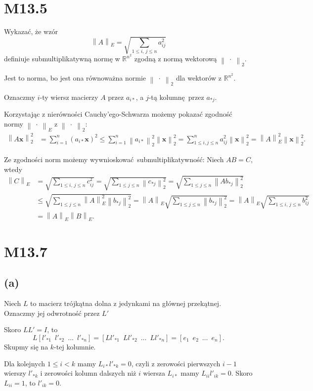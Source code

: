 \documentclass[a4paper, 12pt]{article}
\newcommand{\norm}[1]{\left\lVert #1 \right\rVert}
\newcommand{\+}{\enspace}
\begin{document}
\section*{M13.5}
Wykazać, że wzór
$$\norm{A}_E = \sqrt{∑_{1≤i,\, j≤n} a_{ij}^2}$$
definiuje submultiplikatywną normę w $ℝ^{n^2}$ zgodną z normą wektorową
$\norm{\;·\;}_2$.

Jest to norma, bo jest ona równoważna normie $\norm{\;·\;}_2$ dla wektorów z
$ℝ^{n^2}$.

Oznaczmy $i$-ty wiersz macierzy $A$ przez $a_{i*}$,
a $j$-tą kolumnę przez $a_{*j}$.

Korzystając z nierówności Cauchy'ego-Schwarza możemy pokazać
zgodność normy $\norm{\;·\;}_E$ z $\norm{\;·\;}_2$:
\begin{align*}
\norm{A\mathbf{x}}_2^2
&= ∑_{i=1}^n \left(a_{i*}\mathbf{x}\right)^2
≤ ∑_{i=1}^n \norm{a_{i*}}_2^2 \norm{\mathbf{x}}_2^2
= ∑_{1≤i,j≤n}^n a_{ij}^2 \norm{\mathbf{x}}_2^2
= \norm{A}_E^2 \norm{\mathbf{x}}_2^2.
\end{align*}

Ze zgodności norm możemy wywnioskować submultiplikatywność:
Niech $AB = C$, wtedy
\begin{align*}
\norm{C}_E
&= \sqrt{∑_{1≤i,\, j≤n} c_{ij}^2}
= \sqrt{∑_{1≤j≤n} \norm{c_{*j}}_2^2}
= \sqrt{∑_{1≤j≤n} \norm{A b_{*j}}_2^2} \\
&≤ \sqrt{∑_{1≤j≤n} \norm{A}_E^2 \norm{b_{*j}}_2^2}
= \norm{A}_E \sqrt{∑_{1≤j≤n} \norm{b_{*j}}_2^2}
= \norm{A}_E \sqrt{∑_{1≤i,\, j≤n} b_{ij}^2} \\
&= \norm{A}_E \norm{B}_E.
\end{align*}

\section*{M13.7}
\subsection*{(a)}
Niech $L$ to macierz trójkątna dolna z jedynkami na głównej przekątnej.
Oznaczmy jej odwrotność przez $L'$

Skoro $L L' = I$, to
$$
L [l'_{*1} \+ l'_{*2} \+ … \+ l'_{*n}]
=[L l'_{*1} \+ L l'_{*2} \+ … \+ L l'_{*n}]
=[e_1 \+ e_2 \+ … \+ e_n].
$$
Skupmy się na $k$-tej kolumnie.

Dla kolejnych $1 ≤ i < k$ mamy
$L_{i*} l'_{*k} = 0$, czyli z zerowości pierwszych $i-1$ wierszy $l'_{*k}$
i zerowości kolumn dalszych niż $i$ wiersza $L_{i*}$ mamy
$L_{ii} l'_{ik} = 0$.
Skoro $L_{ii} = 1$, to $l'_{ik} = 0$.
\end{document}
